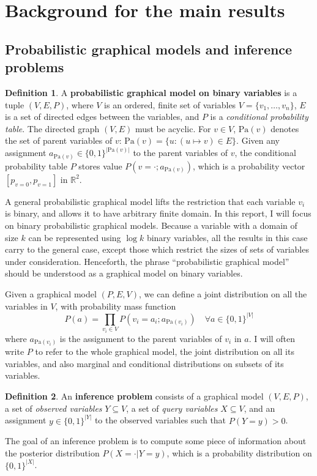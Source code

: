 \documentclass{article}
\theoremstyle{definition}
\newtheorem{defn}{Definition}
\theoremstyle{remark}
\def \Pa{\text{Pa}}
\begin{document}
\section{Background for the main results}

\subsection{Probabilistic graphical models and inference problems}
\begin{defn}
A \textbf{probabilistic graphical model on binary variables} is a tuple $(V, E, P)$, where $V$ is an ordered, finite set of variables $V = \{v_1, \dots, v_n\}$, $E$ is a set of directed edges between the variables, and $P$ is a \textit{conditional probability table}.
The directed graph $(V, E)$ must be acyclic.
For $v \in V$, $\Pa(v)$ denotes the set of parent variables of $v$: $\Pa(v) = \{u : (u \mapsto v) \in E\}$.
Given any assignment $a_{\Pa(v)} \in \{0, 1\}^{|\Pa(v)|}$ to the parent variables of $v$, the conditional probability table $P$ stores value $P(v = \cdot ; a_{\Pa(v)})$, which is a probability vector $[p_{v=0}, p_{v=1}]$ in $\mathbb{R}^2$.
\end{defn}

A general probabilistic graphical model lifts the restriction that each variable $v_i$ is binary, and allows it to have arbitrary finite domain.
In this report, I will focus on binary probabilistic graphical models. Because a variable with a domain of size $k$ can be represented using $\log k$ binary variables, all the results in this case carry to the general case, except those which restrict the sizes of sets of variables under consideration.
Henceforth, the phrase ``probabilistic graphical model'' should be understood as a graphical model on binary variables.

Given a graphical model $(P, E, V)$, we can define a joint distribution on all the variables in $V$, with probability mass function
$$
P(a) = \prod_{v_i \in V}{P(v_i = a_i ; a_{\Pa(v_i)})} \quad \forall a \in \{0, 1\}^{|V|}
$$
where $a_{\Pa(v_i)}$ is the assignment to the parent variables of $v_i$ in $a$.
I will often write $P$ to refer to the whole graphical model, the joint distribution on all its variables, and also marginal and conditional distributions on subsets of its variables.

\begin{defn}
An \textbf{inference problem} consists of a graphical model $(V, E, P)$, a set of \textit{observed variables} $Y \subseteq V$, a set of \textit{query variables} $X \subseteq V$, and an assignment $y \in \{0, 1\}^{|Y|}$ to the observed variables such that $P(Y = y) > 0$.
\end{defn}
The goal of an inference problem is to compute some piece of information about the posterior distribution $P(X = \cdot | Y = y)$, which is a probability distribution on $\{0, 1\}^{|X|}$.
\end{document}
